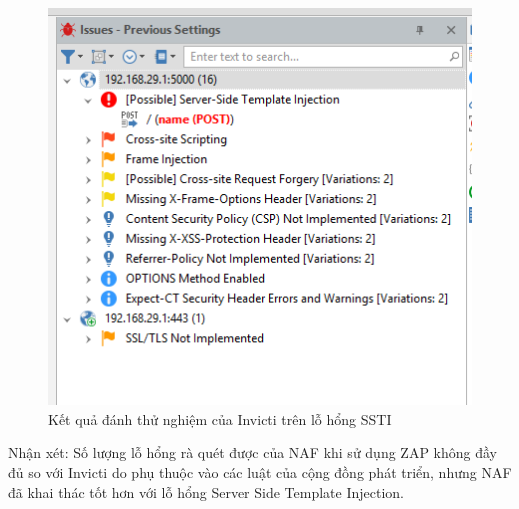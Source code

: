 \documentclass[./../main.tex]{subfiles}
\begin{document}
\begin{figure}[h!]
	\includegraphics[width=\linewidth]{./images/np_vulns.png}
	\caption{Kết quả đánh thử nghiệm của Invicti trên lỗ hổng SSTI}
	\label{fig:np_ssti}
\end{figure}

Nhận xét: Số lượng lỗ hổng rà quét được của NAF khi sử dụng ZAP không đầy đủ so với Invicti do phụ thuộc vào các luật của cộng đồng phát triển, nhưng NAF đã khai thác tốt hơn với lỗ hổng Server Side Template Injection.






\end{document}
